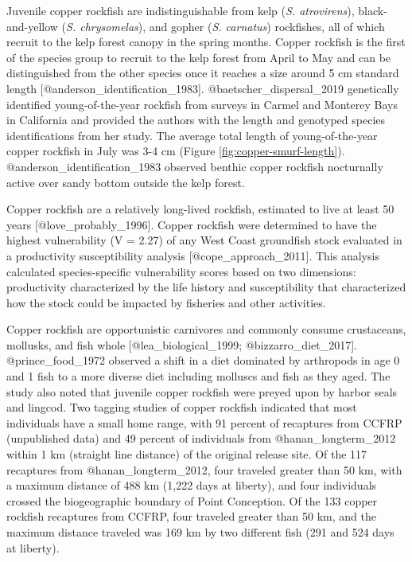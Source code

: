 \documentclass[11pt,
  letterpaper,
]{article}
\begin{document}
Juvenile copper rockfish are indistinguishable from kelp (\emph{S. atrovirens}), black-and-yellow (\emph{S. chrysomelas}), and gopher (\emph{S. carnatus}) rockfishes, all of which recruit to the kelp forest canopy in the spring months. Copper rockfish is the first of the species group to recruit to the kelp forest from April to May and can be distinguished from the other species once it reaches a size around 5 cm standard length {[}@anderson\_identification\_1983{]}. @baetscher\_dispersal\_2019 genetically identified young-of-the-year rockfish from surveys in Carmel and Monterey Bays in California and provided the authors with the length and genotyped species identifications from her study. The average total length of young-of-the-year copper rockfish in July was 3-4 cm (Figure \ref{fig:copper-smurf-length}). @anderson\_identification\_1983 observed benthic copper rockfish nocturnally active over sandy bottom outside the kelp forest.

Copper rockfish are a relatively long-lived rockfish, estimated to live at least 50 years {[}@love\_probably\_1996{]}. Copper rockfish were determined to have the highest vulnerability (V = 2.27) of any West Coast groundfish stock evaluated in a productivity susceptibility analysis {[}@cope\_approach\_2011{]}. This analysis calculated species-specific vulnerability scores based on two dimensions: productivity characterized by the life history and susceptibility that characterized how the stock could be impacted by fisheries and other activities.

Copper rockfish are opportunistic carnivores and commonly consume crustaceans, mollusks, and fish whole {[}@lea\_biological\_1999; @bizzarro\_diet\_2017{]}. @prince\_food\_1972 observed a shift in a diet dominated by arthropods in age 0 and 1 fish to a more diverse diet including molluscs and fish as they aged. The study also noted that juvenile copper rockfish were preyed upon by harbor seals and lingcod. Two tagging studies of copper rockfish indicated that most individuals have a small home range, with 91 percent of recaptures from CCFRP (unpublished data) and 49 percent of individuals from @hanan\_longterm\_2012 within 1 km (straight line distance) of the original release site. Of the 117 recaptures from @hanan\_longterm\_2012, four traveled greater than 50 km, with a maximum distance of 488 km (1,222 days at liberty), and four individuals crossed the biogeographic boundary of Point Conception. Of the 133 copper rockfish recaptures from CCFRP, four traveled greater than 50 km, and the maximum distance traveled was 169 km by two different fish (291 and 524 days at liberty).
\end{document}
